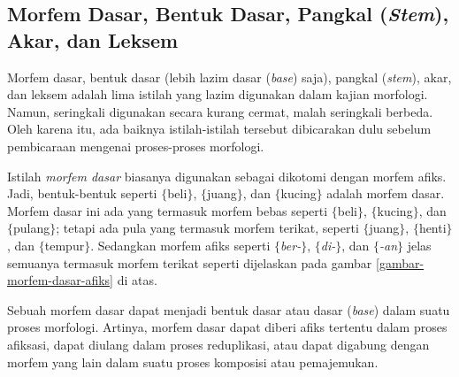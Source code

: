


\subsection{Morfem Dasar, Bentuk Dasar, Pangkal (\textit{Stem}), Akar, dan Leksem}
\label{sec:morfemDasarDLL}

Morfem dasar, bentuk dasar (lebih lazim dasar (\textit{base}) saja), pangkal (\textit{stem}), akar, dan leksem adalah lima istilah yang lazim digunakan dalam kajian morfologi. Namun, seringkali digunakan secara kurang cermat, malah seringkali berbeda. Oleh karena itu, ada baiknya istilah-istilah tersebut dibicarakan dulu sebelum pembicaraan mengenai proses-proses morfologi.

Istilah \textit{morfem dasar} biasanya digunakan sebagai dikotomi dengan morfem afiks. Jadi, bentuk-bentuk seperti $\lbrace$beli$\rbrace$, $\lbrace$juang$\rbrace$, dan $\lbrace$kucing$\rbrace$ adalah morfem dasar. Morfem dasar ini ada yang termasuk morfem bebas seperti $\lbrace$beli$\rbrace$, $\lbrace$kucing$\rbrace$, dan $\lbrace$pulang$\rbrace$; tetapi ada pula yang termasuk morfem terikat, seperti $\lbrace$juang$\rbrace$, $\lbrace$henti$\rbrace$, dan $\lbrace$tempur$\rbrace$. Sedangkan morfem afiks seperti \textit{$\lbrace$ber-$\rbrace$}, \textit{$\lbrace$di-$\rbrace$}, dan \textit{$\lbrace$-an$\rbrace$} jelas semuanya termasuk morfem terikat seperti dijelaskan pada gambar \ref{gambar-morfem-dasar-afiks} di atas.

Sebuah morfem dasar dapat menjadi bentuk dasar atau dasar (\textit{base}) dalam suatu proses morfologi. Artinya, morfem dasar dapat diberi afiks tertentu dalam proses afiksasi, dapat diulang dalam proses reduplikasi, atau dapat digabung dengan morfem yang lain dalam suatu proses komposisi atau pemajemukan.

